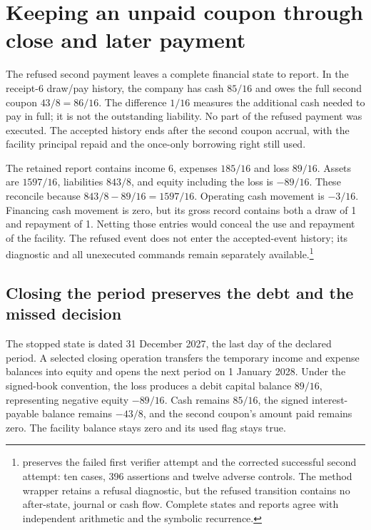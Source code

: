 \section{Keeping an unpaid coupon through close and later payment}
\label{sim:unpaid-coupon-continuation}

The refused second payment leaves a complete financial state to report. In the receipt-6 draw/pay history, the company has cash $85/16$ and owes the full second coupon $43/8=86/16$. The difference $1/16$ measures the additional cash needed to pay in full; it is not the outstanding liability. No part of the refused payment was executed. The accepted history ends after the second coupon accrual, with the facility principal repaid and the once-only borrowing right still used.

The retained report contains income 6, expenses $185/16$ and loss $89/16$. Assets are $1597/16$, liabilities $843/8$, and equity including the loss is $-89/16$. These reconcile because $843/8-89/16=1597/16$. Operating cash movement is $-3/16$. Financing cash movement is zero, but its gross record contains both a draw of 1 and repayment of 1. Netting those entries would conceal the use and repayment of the facility. The refused event does not enter the accepted-event history; its diagnostic and all unexecuted commands remain separately available.\footnote{ preserves the failed first verifier attempt and the corrected successful second attempt: ten cases, 396 assertions and twelve adverse controls. The method wrapper retains a refusal diagnostic, but the refused transition contains no after-state, journal or cash flow. Complete states and reports agree with independent arithmetic and the symbolic recurrence.}

\subsection{Closing the period preserves the debt and the missed decision}

The stopped state is dated 31 December 2027, the last day of the declared period. A selected closing operation transfers the temporary income and expense balances into equity and opens the next period on 1 January 2028. Under the signed-book convention, the loss produces a debit capital balance $89/16$, representing negative equity $-89/16$. Cash remains $85/16$, the signed interest-payable balance remains $-43/8$, and the second coupon's amount paid remains zero. The facility balance stays zero and its used flag stays true.

